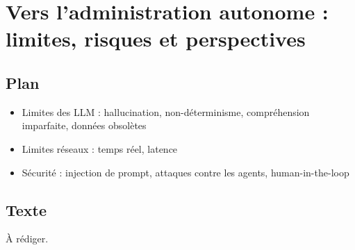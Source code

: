 \chapter{Vers l'administration autonome : limites, risques et perspectives}
\label{chap:partie-4}

\section{Plan}
\begin{itemize}
    \item Limites des LLM : hallucination, non-déterminisme, compréhension imparfaite, données obsolètes
    \item Limites réseaux : temps réel, latence
    \item Sécurité : injection de prompt, attaques contre les agents, human-in-the-loop
\end{itemize}

\section{Texte}
À rédiger.
